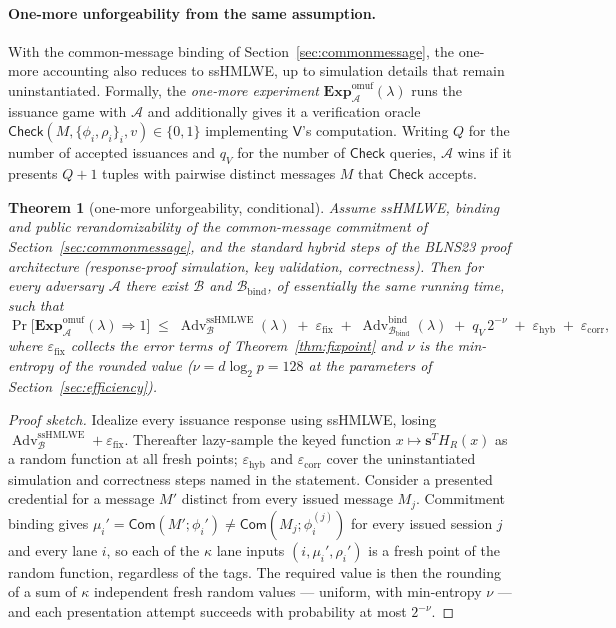 \documentclass[11pt]{article}
\newcommand{\Adv}{\operatorname{Adv}}
\newcommand{\Exp}{\mathbf{Exp}}
\newcommand{\Vrf}{\mathsf{V}}
\newtheorem{theorem}{Theorem}[section]
\begin{document}
\paragraph{One-more unforgeability from the same assumption.}
With the common-message binding of Section~\ref{sec:commonmessage}, the
one-more accounting also reduces to ssHMLWE, up to simulation details that
remain uninstantiated.  Formally, the \emph{one-more experiment}
$\Exp^{\mathrm{omuf}}_{\mathcal A}(\lambda)$ runs the issuance game with
$\mathcal A$ and additionally gives it a verification oracle
$\mathsf{Check}(M,\{\phi_i,\rho_i\}_{i},v)\in\{0,1\}$ implementing $\Vrf$'s
computation.  Writing $Q$ for the number of accepted issuances and $q_V$ for
the number of $\mathsf{Check}$ queries, $\mathcal A$ wins if it presents
$Q+1$ tuples with pairwise distinct messages $M$ that $\mathsf{Check}$
accepts.

\begin{theorem}[one-more unforgeability, conditional]
\label{thm:onemore}
Assume ssHMLWE, binding and public rerandomizability of the common-message
commitment of Section~\ref{sec:commonmessage}, and the standard hybrid steps
of the BLNS23 proof architecture (response-proof simulation, key validation,
correctness).  Then for every adversary $\mathcal A$ there exist
$\mathcal B$ and $\mathcal B_{\mathrm{bind}}$, of essentially the same
running time, such that
\[
 \Pr\bigl[\Exp^{\mathrm{omuf}}_{\mathcal A}(\lambda)\Rightarrow1\bigr]
 \;\le\;
 \Adv^{\mathrm{ssHMLWE}}_{\mathcal B}(\lambda)
 \;+\;\varepsilon_{\mathrm{fix}}
 \;+\;\Adv^{\mathrm{bind}}_{\mathcal B_{\mathrm{bind}}}(\lambda)
 \;+\;q_V\,2^{-\nu}
 \;+\;\varepsilon_{\mathrm{hyb}}
 \;+\;\varepsilon_{\mathrm{corr}},
\]
where $\varepsilon_{\mathrm{fix}}$ collects the error terms of
Theorem~\ref{thm:fixpoint} and $\nu$ is the min-entropy of the rounded value
($\nu=d\log_2 p=128$ at the parameters of Section~\ref{sec:efficiency}).
\end{theorem}

\begin{proof}[Proof sketch]
Idealize every issuance response using ssHMLWE, losing
$\Adv^{\mathrm{ssHMLWE}}_{\mathcal B}+\varepsilon_{\mathrm{fix}}$.
Thereafter lazy-sample the keyed function
$x\mapsto\mathbf s^{T}H_R(x)$ as a random function at all fresh points;
$\varepsilon_{\mathrm{hyb}}$ and $\varepsilon_{\mathrm{corr}}$ cover the
uninstantiated simulation and correctness steps named in the statement.
Consider a presented credential for a message $M'$ distinct from every
issued message $M_j$.  Commitment binding gives
$\mu_i'=\mathsf{Com}(M';\phi_i')\neq\mathsf{Com}(M_j;\phi_i^{(j)})$ for
every issued session $j$ and every lane $i$, so each of the $\kappa$ lane
inputs $(i,\mu_i',\rho_i')$ is a fresh point of the random function,
regardless of the tags.  The required value is then the rounding of a sum of
$\kappa$ independent fresh random values --- uniform, with min-entropy
$\nu$ --- and each presentation attempt succeeds with probability at most
$2^{-\nu}$.
\end{proof}
\end{document}
